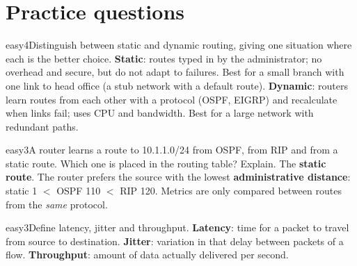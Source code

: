 \documentclass[10pt]{article}
\begin{document}
\section{Practice questions}
\setcounter{pq}{0}

\begin{practice}{easy}{4}Distinguish between static and dynamic routing, giving one situation where each is the better choice.
\sol \textbf{Static}: routes typed in by the administrator; no overhead and secure, but do not adapt to failures. Best for a small branch with one link to head office (a stub network with a default route).
\textbf{Dynamic}: routers learn routes from each other with a protocol (OSPF, EIGRP) and recalculate when links fail; uses CPU and bandwidth. Best for a large network with redundant paths.
\end{practice}

\begin{practice}{easy}{3}A router learns a route to 10.1.1.0/24 from OSPF, from RIP and from a static route. Which one is placed in the routing table? Explain.
\sol The \textbf{static route}. The router prefers the source with the lowest \textbf{administrative distance}: static 1 $<$ OSPF 110 $<$ RIP 120. Metrics are only compared between routes from the \emph{same} protocol.
\end{practice}

\begin{practice}{easy}{3}Define latency, jitter and throughput.
\sol \textbf{Latency}: time for a packet to travel from source to destination. \textbf{Jitter}: variation in that delay between packets of a flow. \textbf{Throughput}: amount of data actually delivered per second.
\end{practice}
\end{document}
